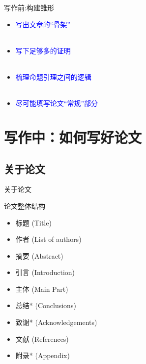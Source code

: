 \documentclass[UTF8]{ctexbeamer}
\begin{document}
\begin{frame}{写作前:构建雏形}
\begin{itemize}
    \item \textcolor{blue}{写出文章的“骨架”}\\ \ \\
    \item \textcolor{blue}{写下足够多的证明} \\ \ \\
    \item \textcolor{blue}{梳理命题引理之间的逻辑}\\ \ \\
    \item \textcolor{blue}{尽可能填写论文“常规”部分}
\end{itemize}
\end{frame}

\section{写作中：如何写好论文}
\subsection{关于论文}
\begin{frame}{关于论文}
\begin{alertblock}{论文整体结构}
\end{alertblock}
        \begin{itemize}
            \item 标题 (Title)
            \item 作者 (List of authors)
            \item 摘要 (Abstract)
            \item 引言 (Introduction)
            \item 主体 (Main Part)
            \item 总结* (Conclusions)
            \item 致谢* (Acknowledgements)
            \item 文献 (References)
            \item 附录* (Appendix)
        \end{itemize}
\end{frame}
\end{document}
